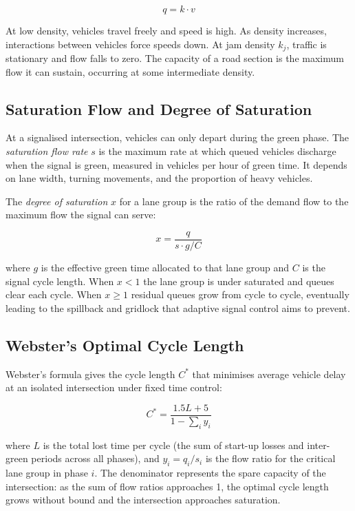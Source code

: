 ﻿\documentclass[11pt, a4paper]{report}
\begin{document}
\begin{equation}
q = k \cdot v
\label{eq:fundamental}
\end{equation}

At low density, vehicles travel freely and speed is high. As density increases, interactions between vehicles force speeds down. At jam density $k_j$, traffic is stationary and flow falls to zero. The capacity of a road section is the maximum flow it can sustain, occurring at some intermediate density.

\subsection{Saturation Flow and Degree of Saturation}

At a signalised intersection, vehicles can only depart during the green phase. The \textit{saturation flow rate} $s$ is the maximum rate at which queued vehicles discharge when the signal is green, measured in vehicles per hour of green time. It depends on lane width, turning movements, and the proportion of heavy vehicles.

The \textit{degree of saturation} $x$ for a lane group is the ratio of the demand flow to the maximum flow the signal can serve:

\begin{equation}
x = \frac{q}{s \cdot g/C}
\label{eq:saturation}
\end{equation}

where $g$ is the effective green time allocated to that lane group and $C$ is the signal cycle length. When $x < 1$ the lane group is under saturated and queues clear each cycle. When $x \geq 1$ residual queues grow from cycle to cycle, eventually leading to the spillback and gridlock that adaptive signal control aims to prevent.

\subsection{Webster's Optimal Cycle Length}

Webster's formula \cite{tang2019global} gives the cycle length $C^*$ that minimises average vehicle delay at an isolated intersection under fixed time control:

\begin{equation}
C^* = \frac{1.5L + 5}{1 - \sum_i y_i}
\label{eq:webster}
\end{equation}

where $L$ is the total lost time per cycle (the sum of start-up losses and inter-green periods across all phases), and $y_i = q_i / s_i$ is the flow ratio for the critical lane group in phase $i$. The denominator represents the spare capacity of the intersection: as the sum of flow ratios approaches 1, the optimal cycle length grows without bound and the intersection approaches saturation.
\end{document}
